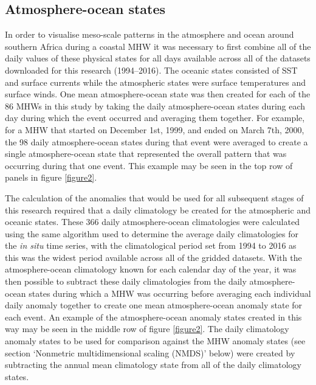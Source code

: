 \documentclass[utf8]{frontiersSCNS}
\begin{document}
\subsection{Atmosphere-ocean states}
In order to visualise meso-scale patterns in the atmosphere and ocean around southern Africa during a coastal MHW it was necessary to first combine all of the daily values of these physical states for all days available across all of the datasets downloaded for this research (1994--2016). The oceanic states consisted of SST and surface currents while the atmospheric states were surface temperatures and surface winds. One mean atmosphere-ocean state was then created for each of the 86 MHWs in this study by taking the daily atmosphere-ocean states during each day during which the event occurred and averaging them together. For example, for a MHW that started on December 1st, 1999, and ended on March 7th, 2000, the 98 daily atmosphere-ocean states during that event were averaged to create a single atmosphere-ocean state that represented the overall pattern that was occurring during that one event. This example may be seen in the top row of panels in figure \ref{figure2}.

The calculation of the anomalies that would be used for all subsequent stages of this research required that a daily climatology be created for the atmospheric and oceanic states. These 366 daily atmosphere-ocean climatologies were calculated using the same algorithm used to determine the average daily climatologies for the \emph{in situ} time series, with the climatological period set from 1994 to 2016 as this was the widest period available across all of the gridded datasets. With the atmosphere-ocean climatology known for each calendar day of the year, it was then possible to subtract these daily climatologies from the daily atmosphere-ocean states during which a MHW was occurring before averaging each individual daily anomaly together to create one mean atmosphere-ocean anomaly state for each event. An example of the atmosphere-ocean anomaly states created in this way may be seen in the middle row of figure \ref{figure2}. The daily climatology anomaly states to be used for comparison against the MHW anomaly states (see section `Nonmetric multidimensional scaling (NMDS)' below) were created by subtracting the annual mean climatology state from all of the daily climatology states.


\end{document}
